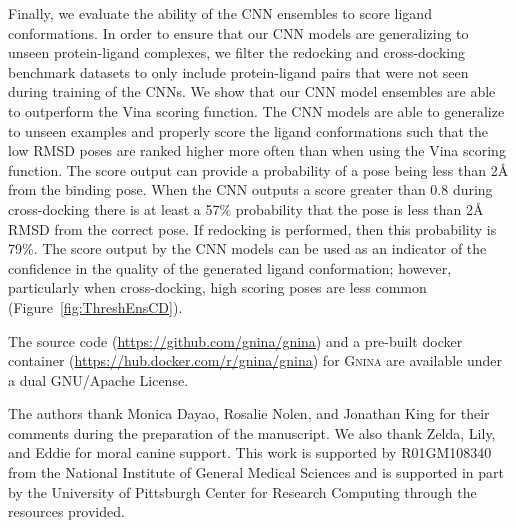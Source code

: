 \documentclass[journal=jcisd8,manuscript=article]{achemso}
\begin{document}
Finally, we evaluate the ability of the CNN ensembles to score ligand conformations. In order to ensure that our CNN models are generalizing to unseen protein-ligand complexes, we filter the redocking and cross-docking benchmark datasets to only include protein-ligand pairs that were not seen during training of the CNNs. We show that our CNN model ensembles are able to outperform the Vina scoring function. The CNN models are able to generalize to unseen examples and properly score the ligand conformations such that the low RMSD poses are ranked higher more often than when using the Vina scoring function. The score output can provide a probability of a pose being less than 2{\AA} from the binding pose. When the CNN outputs a score greater than 0.8 during cross-docking there is at least a 57\% probability that the pose is less than 2{\AA} RMSD from the correct pose. If redocking is performed, then this probability is 79\%. The score output by the CNN models can be used as an indicator of the confidence in the quality of the generated ligand conformation; however, particularly when cross-docking, high scoring poses are less common (Figure~\ref{fig:ThreshEnsCD}).

The source code (\url{https://github.com/gnina/gnina}) and a pre-built docker container (\url{https://hub.docker.com/r/gnina/gnina}) for \textsc{Gnina} are available under a dual GNU/Apache License.


\begin{acknowledgement}
The authors thank Monica Dayao, Rosalie Nolen, and Jonathan King for their comments during the preparation of the manuscript. We also thank Zelda, Lily, and Eddie for moral canine support.
This work is supported by R01GM108340 from the National Institute of General Medical Sciences and is supported in part by the University of Pittsburgh Center for Research Computing through the resources provided.



\end{acknowledgement}

\begin{suppinfo}
  


\end{suppinfo}


\end{document}
